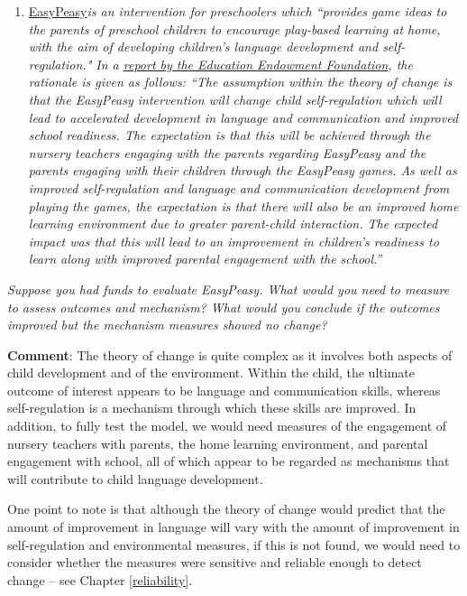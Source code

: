 \documentclass{krantz}
\providecommand{\tightlist}{%
\setlength{\itemsep}{0pt}\setlength{\parskip}{0pt}}
\begin{document}
\begin{enumerate}
\def\labelenumi{\arabic{enumi}.}
\setcounter{enumi}{1}
\tightlist
\item
  \href{https://guidebook.eif.org.uk/programme/easypeasy}{EasyPeasy}\emph{is an intervention for preschoolers which ``provides game ideas to the parents of preschool children to encourage play-based learning at home, with the aim of developing children's language development and self-regulation." In a \href{https://d2tic4wvo1iusb.cloudfront.net/documents/projects/EasyPeasy.pdf?v=1686132397}{report by the Education Endowment Foundation}, the rationale is given as follows: ``The assumption within the theory of change is that the EasyPeasy intervention will change child self-regulation which will lead to accelerated development in language and communication and improved school readiness. The expectation is that this will be achieved through the nursery teachers engaging with the parents regarding EasyPeasy and the parents engaging with their children through the EasyPeasy games. As well as improved self-regulation and language and communication development from playing the games, the expectation is that there will also be an improved home learning environment due to greater parent-child interaction. The expected impact was that this will lead to an improvement in children's readiness to learn along with improved parental engagement with the school.''}
\end{enumerate}

\emph{Suppose you had funds to evaluate EasyPeasy. What would you need to measure to assess outcomes and mechanism? What would you conclude if the outcomes improved but the mechanism measures showed no change?}

\textbf{Comment}: The theory of change is quite complex as it involves both aspects of child development and of the environment. Within the child, the ultimate outcome of interest appears to be language and communication skills, whereas self-regulation is a mechanism through which these skills are improved. In addition, to fully test the model, we would need measures of the engagement of nursery teachers with parents, the home learning environment, and parental engagement with school, all of which appear to be regarded as mechanisms that will contribute to child language development.

One point to note is that although the theory of change would predict that the amount of improvement in language will vary with the amount of improvement in self-regulation and environmental measures, if this is not found, we would need to consider whether the measures were sensitive and reliable enough to detect change -- see Chapter \ref{reliability}.
\end{document}
